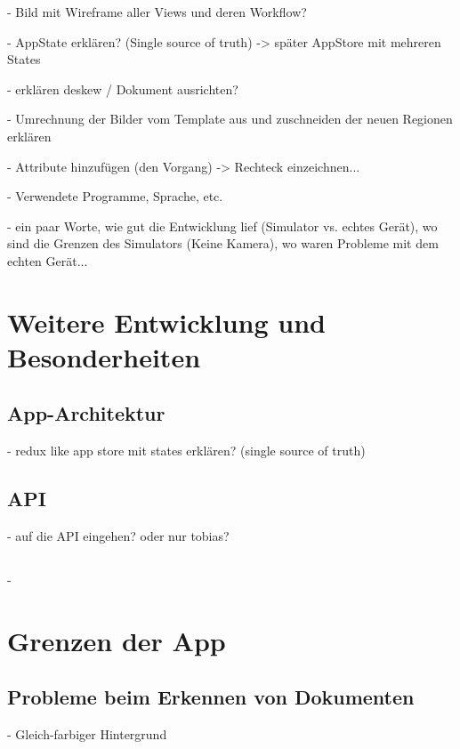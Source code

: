 \documentclass[nomenclature, 150]{HSMW-Thesis}
\begin{document}
	- Bild mit Wireframe aller Views und deren Workflow?
	
	- AppState erklären? (Single source of truth) -> später AppStore mit mehreren States
	
	- erklären deskew / Dokument ausrichten?
	
	- Umrechnung der Bilder vom Template aus und zuschneiden der neuen Regionen erklären
	
	- Attribute hinzufügen (den Vorgang) -> Rechteck einzeichnen...
	
	- Verwendete Programme, Sprache, etc. 
	
	- ein paar Worte, wie gut die Entwicklung lief (Simulator vs. echtes Gerät), wo sind die Grenzen des Simulators (Keine Kamera), wo waren Probleme mit dem echten Gerät...
	



\chapter{Weitere Entwicklung und Besonderheiten}

	\section{App-Architektur}
		- redux like app store mit states erklären? (single source of truth)
	
	\section{API}
		- auf die API eingehen? oder nur tobias?
	
	\section{}
		- 




\chapter{Grenzen der App}
	\section{Probleme beim Erkennen von Dokumenten}
		- Gleich-farbiger Hintergrund
			
\end{document}
